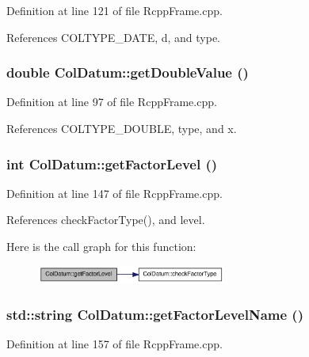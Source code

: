 Definition at line 121 of file RcppFrame.cpp.

References COLTYPE\_\-DATE, d, and type.\hypertarget{classColDatum_a6a19044be8ade2b14b372b179210a9bd}{
\subsubsection[{getDoubleValue}]{\setlength{\rightskip}{0pt plus 5cm}double ColDatum::getDoubleValue ()}}
\label{classColDatum_a6a19044be8ade2b14b372b179210a9bd}


Definition at line 97 of file RcppFrame.cpp.

References COLTYPE\_\-DOUBLE, type, and x.\hypertarget{classColDatum_adf3716db9f3483f3cd255a4c05823479}{
\subsubsection[{getFactorLevel}]{\setlength{\rightskip}{0pt plus 5cm}int ColDatum::getFactorLevel ()}}
\label{classColDatum_adf3716db9f3483f3cd255a4c05823479}


Definition at line 147 of file RcppFrame.cpp.

References checkFactorType(), and level.

Here is the call graph for this function:\nopagebreak
\begin{figure}[H]
\begin{center}
\leavevmode
\includegraphics[width=176pt]{classColDatum_adf3716db9f3483f3cd255a4c05823479_cgraph}
\end{center}
\end{figure}
\hypertarget{classColDatum_a012df5970083052c2348cbda9ed646bb}{
\subsubsection[{getFactorLevelName}]{\setlength{\rightskip}{0pt plus 5cm}std::string ColDatum::getFactorLevelName ()}}
\label{classColDatum_a012df5970083052c2348cbda9ed646bb}


Definition at line 157 of file RcppFrame.cpp.

